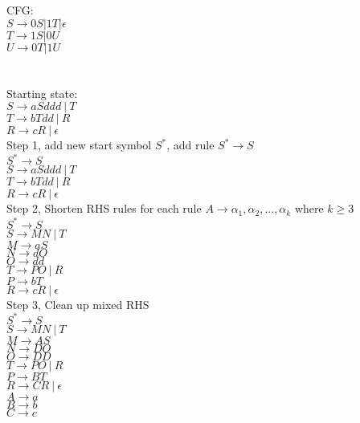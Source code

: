 \documentclass[10pt,letterpaper]{article}
\begin{document}
\noindent CFG:\\
$S \rightarrow 0S | 1T | \epsilon$\\
$T \rightarrow 1S | 0U$\\
$U \rightarrow 0T | 1U$\\

\section{}
Starting state:\\
$S \rightarrow aSddd\ |\ T$\\
$T \rightarrow bTdd\ |\ R$\\
$R \rightarrow cR\ |\ \epsilon$\\

Step 1, add new start symbol $S^*$, add rule $S^* \rightarrow S$\\
$S^* \rightarrow S$\\
$S \rightarrow aSddd\ |\ T$\\
$T \rightarrow bTdd\ |\ R$\\
$R \rightarrow cR\ |\ \epsilon$\\

Step 2, Shorten RHS rules for each rule $A \rightarrow \alpha_1, \alpha_2,...,\alpha_k$
where $k \geq 3$\\
$S^* \rightarrow S$\\
$S \rightarrow MN\ |\ T$\\
$M \rightarrow aS$\\
$N \rightarrow dO$\\
$O \rightarrow dd$\\
$T \rightarrow PO\ |\ R$\\
$P \rightarrow bT$\\
$R \rightarrow cR\ |\ \epsilon$\\

Step 3, Clean up mixed RHS\\
$S^* \rightarrow S$\\
$S \rightarrow MN\ |\ T$\\
$M \rightarrow AS$\\
$N \rightarrow DO$\\
$O \rightarrow DD$\\
$T \rightarrow PO\ |\ R$\\
$P \rightarrow BT$\\
$R \rightarrow CR\ |\ \epsilon$\\
$A \rightarrow a$\\
$B \rightarrow b$\\
$C \rightarrow c$\\
\end{document}
